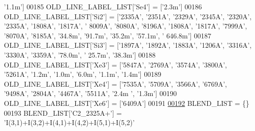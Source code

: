 \begin{DoxyCode}
{{       \textcolor{stringliteral}{'1.1m'}]
00185 OLD\_LINE\_LABEL\_LIST[\textcolor{stringliteral}{'Se4'}] = [\textcolor{stringliteral}{'2.3m'}]
00186 OLD\_LINE\_LABEL\_LIST[\textcolor{stringliteral}{'Si2'}] = [\textcolor{stringliteral}{'2335A'}, \textcolor{stringliteral}{'2351A'}, \textcolor{stringliteral}{'2329A'}, \textcolor{stringliteral}{'2345A'}, \textcolor{stringliteral}{'2320A'}, \textcolor{stringliteral}{'2335A'}, \textcolor{stringliteral}{'1808A'}, \textcolor{stringliteral}{'1817A'}, \textcolor{stringliteral}{'
      8009A'}, \textcolor{stringliteral}{'8080A'}, \textcolor{stringliteral}{'8196A'}, \textcolor{stringliteral}{'1808A'}, \textcolor{stringliteral}{'1817A'}, \textcolor{stringliteral}{'7999A'}, \textcolor{stringliteral}{'8070A'}, \textcolor{stringliteral}{'8185A'}, \textcolor{stringliteral}{'34.8m'}, \textcolor{stringliteral}{'91.7m'}, \textcolor{stringliteral}{'35.2m'}, \textcolor{stringliteral}{'57.1m'}, \textcolor{stringliteral}{'
      646.8m'}]
00187 OLD\_LINE\_LABEL\_LIST[\textcolor{stringliteral}{'Si3'}] = [\textcolor{stringliteral}{'1897A'}, \textcolor{stringliteral}{'1892A'}, \textcolor{stringliteral}{'1883A'}, \textcolor{stringliteral}{'1206A'}, \textcolor{stringliteral}{'3316A'}, \textcolor{stringliteral}{'3330A'}, \textcolor{stringliteral}{'3359A'}, \textcolor{stringliteral}{'78.0m'}, \textcolor{stringliteral}{'
      25.7m'}, \textcolor{stringliteral}{'38.3m'}]
00188 OLD\_LINE\_LABEL\_LIST[\textcolor{stringliteral}{'Xe3'}] = [\textcolor{stringliteral}{'5847A'}, \textcolor{stringliteral}{'2769A'}, \textcolor{stringliteral}{'3574A'}, \textcolor{stringliteral}{'3800A'}, \textcolor{stringliteral}{'5261A'}, \textcolor{stringliteral}{'1.2m'}, \textcolor{stringliteral}{'1.0m'}, \textcolor{stringliteral}{'6.0m'}, \textcolor{stringliteral}{'1.1m'}, \textcolor{stringliteral}{
      '1.4m'}]
00189 OLD\_LINE\_LABEL\_LIST[\textcolor{stringliteral}{'Xe4'}] = [\textcolor{stringliteral}{'7535A'}, \textcolor{stringliteral}{'5709A'}, \textcolor{stringliteral}{'3566A'}, \textcolor{stringliteral}{'6769A'}, \textcolor{stringliteral}{'9498A'}, \textcolor{stringliteral}{'2804A'}, \textcolor{stringliteral}{'4467A'}, \textcolor{stringliteral}{'5511A'}, \textcolor{stringliteral}{'2.4m
      '}, \textcolor{stringliteral}{'1.3m'}]
00190 OLD\_LINE\_LABEL\_LIST[\textcolor{stringliteral}{'Xe6'}] = [\textcolor{stringliteral}{'6409A'}]
00191 
\hypertarget{init_8py_source_l00192}{}\hyperlink{namespacepyneb_1_1utils_1_1init_a88fe95af75ee9a6faed10cc8a74bac2e}{00192} BLEND\_LIST = \{\}
00193 BLEND\_LIST[\textcolor{stringliteral}{'C2\_2325A+'}] = \textcolor{stringliteral}{'I(3,1)+I(3,2)+I(4,1)+I(4,2)+I(5,1)+I(5,2)'}
}}
\end{DoxyCode}
